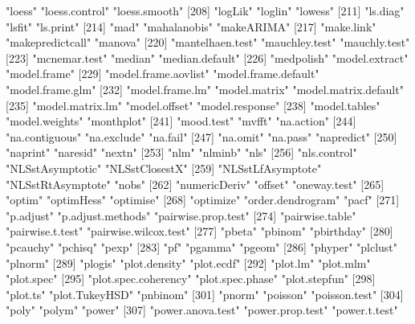 \begin{Schunk}
\begin{Soutput}
[205] "loess"                "loess.control"        "loess.smooth"        
[208] "logLik"               "loglin"               "lowess"              
[211] "ls.diag"              "lsfit"                "ls.print"            
[214] "mad"                  "mahalanobis"          "makeARIMA"           
[217] "make.link"            "makepredictcall"      "manova"              
[220] "mantelhaen.test"      "mauchley.test"        "mauchly.test"        
[223] "mcnemar.test"         "median"               "median.default"      
[226] "medpolish"            "model.extract"        "model.frame"         
[229] "model.frame.aovlist"  "model.frame.default"  "model.frame.glm"     
[232] "model.frame.lm"       "model.matrix"         "model.matrix.default"
[235] "model.matrix.lm"      "model.offset"         "model.response"      
[238] "model.tables"         "model.weights"        "monthplot"           
[241] "mood.test"            "mvfft"                "na.action"           
[244] "na.contiguous"        "na.exclude"           "na.fail"             
[247] "na.omit"              "na.pass"              "napredict"           
[250] "naprint"              "naresid"              "nextn"               
[253] "nlm"                  "nlminb"               "nls"                 
[256] "nls.control"          "NLSstAsymptotic"      "NLSstClosestX"       
[259] "NLSstLfAsymptote"     "NLSstRtAsymptote"     "nobs"                
[262] "numericDeriv"         "offset"               "oneway.test"         
[265] "optim"                "optimHess"            "optimise"            
[268] "optimize"             "order.dendrogram"     "pacf"                
[271] "p.adjust"             "p.adjust.methods"     "pairwise.prop.test"  
[274] "pairwise.table"       "pairwise.t.test"      "pairwise.wilcox.test"
[277] "pbeta"                "pbinom"               "pbirthday"           
[280] "pcauchy"              "pchisq"               "pexp"                
[283] "pf"                   "pgamma"               "pgeom"               
[286] "phyper"               "plclust"              "plnorm"              
[289] "plogis"               "plot.density"         "plot.ecdf"           
[292] "plot.lm"              "plot.mlm"             "plot.spec"           
[295] "plot.spec.coherency"  "plot.spec.phase"      "plot.stepfun"        
[298] "plot.ts"              "plot.TukeyHSD"        "pnbinom"             
[301] "pnorm"                "poisson"              "poisson.test"        
[304] "poly"                 "polym"                "power"               
[307] "power.anova.test"     "power.prop.test"      "power.t.test"        

\end{Soutput}
\end{Schunk}
